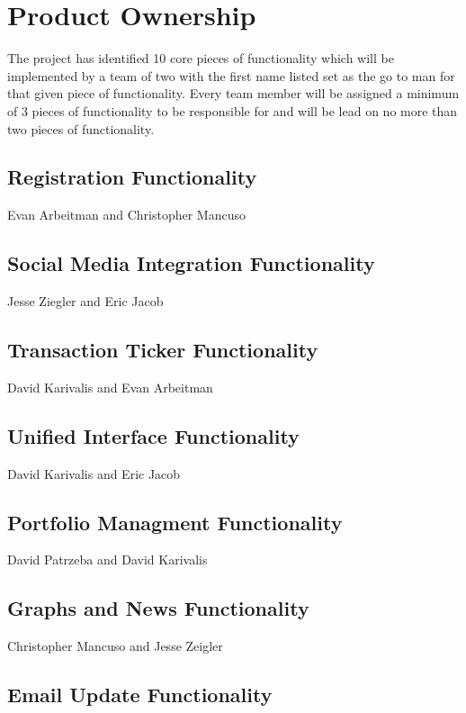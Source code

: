 \documentclass[11pt,letterpaper,oneside]{memoir}
\begin{document}
\chapter{Product Ownership}
The project has identified 10 core pieces of functionality which will be implemented by a team of two
with the first name listed set as the go to man for that given piece of functionality.  Every team
member will be assigned a minimum of 3 pieces of functionality to be responsible for and will be
lead on no more than two pieces of functionality.

\section{Registration Functionality}

Evan Arbeitman and Christopher Mancuso

\section{Social Media Integration Functionality}

Jesse Ziegler and Eric Jacob

\section{Transaction Ticker Functionality}

David Karivalis and Evan Arbeitman

\section{Unified Interface Functionality}

David Karivalis and Eric Jacob

\section{Portfolio Managment Functionality}

David Patrzeba and David Karivalis

\section{Graphs and News Functionality}

Christopher Mancuso and Jesse Zeigler

\section{Email Update Functionality}
\end{document}
